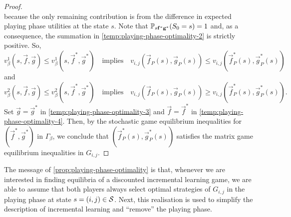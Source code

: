 \begin{proof}
\begin{equation}
        \end{equation}
        because the only remaining contribution is from the difference in expected playing phase utilities at the state $s$.
        Note that $\mathbb{P}_{s \mathbf{f}^* \mathbf{g}^*}(S_0 = s) = 1$ and, as a consequence, the summation in \eqref{temp:playing-phase-optimality-2} is strictly positive.
        So,
        \begin{equation} \label{temp:playing-phase-optimality-3}
            v_\beta^1(s, \vec{f}, \vec{g})
                \le v_\beta^1(s, \vec{f}^*, \vec{g}^*)
            \quad\text{implies}\quad
            v_{i, j}(\vec{f}_P(s), \vec{g}_P(s))
                \le v_{i, j}(\vec{f}^*_P(s), \vec{g}^*_P(s))
        \end{equation}
        and
        \begin{equation} \label{temp:playing-phase-optimality-4}
            v_\beta^2(s, \vec{f}, \vec{g})
                \le v_\beta^2(s, \vec{f}^*, \vec{g}^*)
            \quad\text{implies}\quad
            v_{i, j}(\vec{f}_P(s), \vec{g}_P(s))
                \ge v_{i, j}(\vec{f}^*_P(s), \vec{g}^*_P(s)).
        \end{equation}
        Set $\vec{g} = \vec{g}^*$ in \eqref{temp:playing-phase-optimality-3} and $\vec{f} = \vec{f}^*$ in \eqref{temp:playing-phase-optimality-4}.
        Then, by the stochastic game equilibrium inequalities for $(\vec{f}^*, \vec{g}^*)$ in $\Gamma_\beta$, we conclude that $(\vec{f}^*_P(s), \vec{g}^*_P(s))$ satisfies the matrix game equilibrium inequalities in $G_{i, j}$.
    \end{proof}

    The message of \autoref{prop:playing-phase-optimality} is that, whenever we are interested in finding equilibria of a discounted incremental learning game, we are able to assume that both players always select optimal strategies of $G_{i, j}$ in the playing phase at state $s = (i, j) \in \mathcal{S}$.
    Next, this realisation is used to simplify the description of incremental learning and ``remove'' the playing phase.

